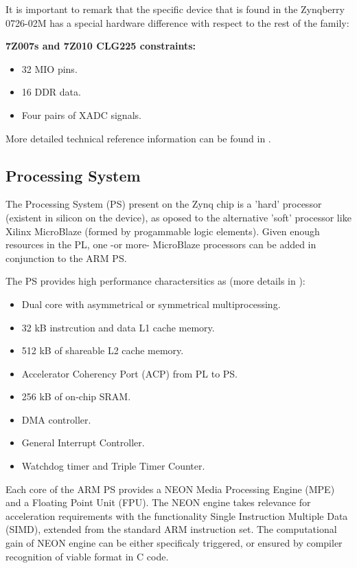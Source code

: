 It is important to remark that the specific device that is found in the Zynqberry 0726-02M has a special hardware difference with respect to the rest of the family:
\begin{quote} 
	\centering 
\end{quote}
\textbf{7Z007s and 7Z010 CLG225 constraints:}
\begin{itemize}
	\item 32 MIO pins.
	\item 16 DDR data.
	\item Four pairs of XADC signals.
\end{itemize}

More detailed technical reference information can be found in \cite[p.~30]{UG585}.

\subsection{Processing System}

The Processing System (PS) present on the Zynq chip is a 'hard' processor (existent in silicon on the device), as oposed to the alternative 'soft' processor like Xilinx MicroBlaze (formed by progammable logic elements). Given enough resources in the PL, one -or more- MicroBlaze processors can be added in conjunction to the ARM PS. 

The PS provides high performance charactersitics as (more details in \cite[p.~32]{UG585}):
\begin{itemize}
	\item Dual core with asymmetrical or symmetrical multiprocessing.
	\item 32 kB instrcution and data L1 cache memory.
	\item 512 kB of shareable L2 cache memory.
	\item Accelerator Coherency Port (ACP) from PL to PS.
	\item 256 kB of on-chip SRAM.
	\item DMA controller.
	\item General Interrupt Controller.
	\item Watchdog timer and Triple Timer Counter.
\end{itemize}

Each core of the ARM PS provides a NEON Media Processing Engine (MPE) and a Floating Point Unit (FPU). The NEON engine takes relevance for acceleration requirements with the functionality Single Instruction Multiple Data (SIMD), extended from the standard ARM instruction set. The computational gain of NEON engine can be either specificaly triggered, or ensured by compiler recognition of viable format in C code.

